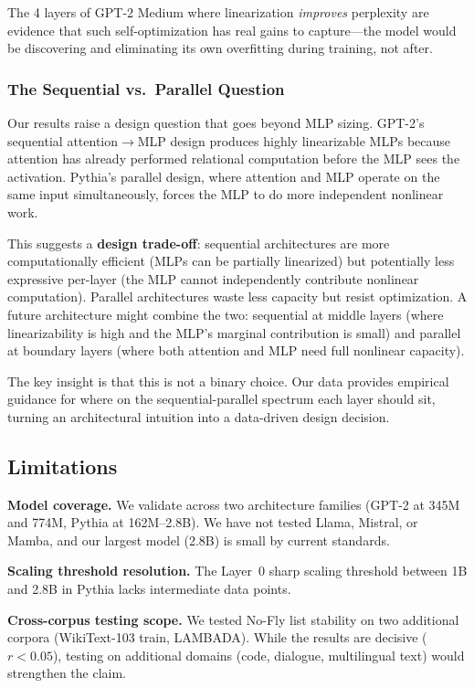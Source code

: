 \documentclass[11pt]{article}
\begin{document}
The 4 layers of GPT-2 Medium where linearization \textit{improves} perplexity are evidence that such self-optimization has real gains to capture---the model would be discovering and eliminating its own overfitting during training, not after.

\subsubsection{The Sequential vs.\ Parallel Question}

Our results raise a design question that goes beyond MLP sizing. GPT-2's sequential attention$\to$MLP design produces highly linearizable MLPs because attention has already performed relational computation before the MLP sees the activation. Pythia's parallel design, where attention and MLP operate on the same input simultaneously, forces the MLP to do more independent nonlinear work.

This suggests a \textbf{design trade-off}: sequential architectures are more computationally efficient (MLPs can be partially linearized) but potentially less expressive per-layer (the MLP cannot independently contribute nonlinear computation). Parallel architectures waste less capacity but resist optimization. A future architecture might combine the two: sequential at middle layers (where linearizability is high and the MLP's marginal contribution is small) and parallel at boundary layers (where both attention and MLP need full nonlinear capacity).

The key insight is that this is not a binary choice. Our data provides empirical guidance for where on the sequential-parallel spectrum each layer should sit, turning an architectural intuition into a data-driven design decision.

\subsection{Limitations}

\textbf{Model coverage.} We validate across two architecture families (GPT-2 at 345M and 774M, Pythia at 162M--2.8B). We have not tested Llama, Mistral, or Mamba, and our largest model (2.8B) is small by current standards.

\textbf{Scaling threshold resolution.} The Layer~0 sharp scaling threshold between 1B and 2.8B in Pythia lacks intermediate data points.

\textbf{Cross-corpus testing scope.} We tested No-Fly list stability on two additional corpora (WikiText-103 train, LAMBADA). While the results are decisive ($r < 0.05$), testing on additional domains (code, dialogue, multilingual text) would strengthen the claim.
\end{document}
